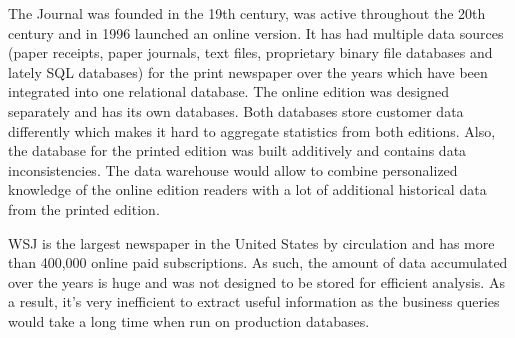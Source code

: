 The Journal was founded in the 19th century, was active throughout the 20th century and in
1996 launched an online version. It has had multiple data sources (paper receipts, paper journals, text files, proprietary binary file databases and lately SQL databases) for the print newspaper over the years which have been integrated into one relational database. The online edition was designed separately and has its own databases. Both databases store customer data differently which makes it hard to aggregate statistics from both editions. Also, the database for the printed edition was built additively and contains data inconsistencies. The data warehouse would allow to combine personalized knowledge of the online edition readers with a lot of additional historical data from the printed edition.

WSJ is the largest newspaper in the United States by circulation and has more than 400,000 online paid subscriptions. As such, the amount of data accumulated over the years is huge and was not designed to be stored for efficient analysis. As a result, it’s very inefficient to extract useful information as the business queries would take a long time when run on production databases.

